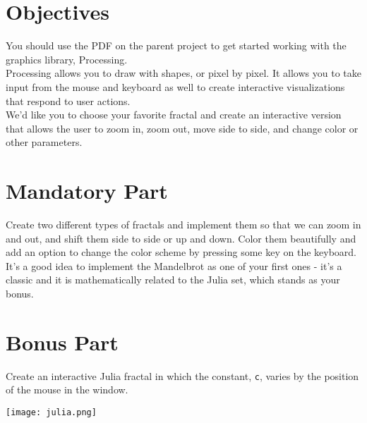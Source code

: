 \documentclass{42-en}
\begin{document}
\chapter{Objectives}

You should use the PDF on the parent project to get started working with the graphics library, Processing.\\

Processing allows you to draw with shapes, or pixel by pixel. It allows you to take input from the mouse and keyboard as well to create interactive visualizations that respond to user actions.\\

We'd like you to choose your favorite fractal and create an interactive version that allows the user to zoom in, zoom out, move side to side, and change color or other parameters.



\chapter{Mandatory Part}

Create two different types of fractals and implement them so that we can zoom in and out, and shift them side to side or up and down. Color them beautifully and add an option to change the color scheme by pressing some key on the keyboard.\\

It's a good idea to implement the Mandelbrot as one of your first ones - it's a classic and it is mathematically related to the Julia set, which stands as your bonus.


\chapter{Bonus Part}

Create an interactive Julia fractal in which the constant, \texttt{c}, varies by the position of the mouse in the window.

\begin{center}
\texttt{[image: julia.png]}
\end{center}
\end{document}
